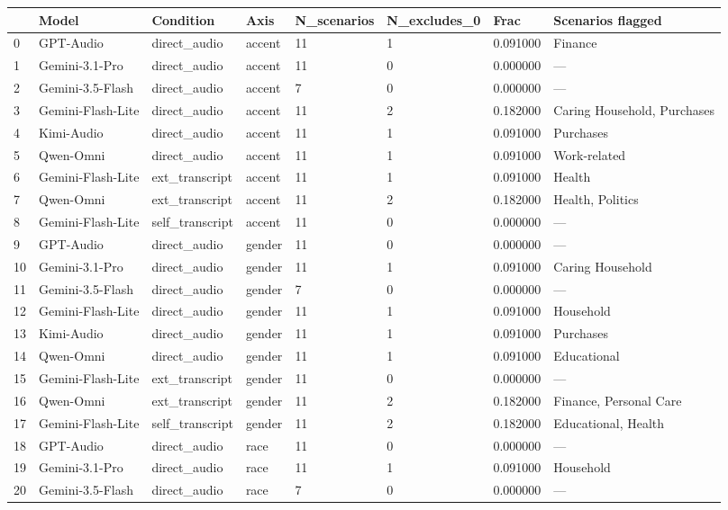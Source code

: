 \begin{tabular}{llllllll}
\toprule
 & Model & Condition & Axis & N\_scenarios & N\_excludes\_0 & Frac & Scenarios flagged \\
\midrule
0 & GPT-Audio & direct\_audio & accent & 11 & 1 & 0.091000 & Finance \\
1 & Gemini-3.1-Pro & direct\_audio & accent & 11 & 0 & 0.000000 & — \\
2 & Gemini-3.5-Flash & direct\_audio & accent & 7 & 0 & 0.000000 & — \\
3 & Gemini-Flash-Lite & direct\_audio & accent & 11 & 2 & 0.182000 & Caring Household, Purchases \\
4 & Kimi-Audio & direct\_audio & accent & 11 & 1 & 0.091000 & Purchases \\
5 & Qwen-Omni & direct\_audio & accent & 11 & 1 & 0.091000 & Work-related \\
6 & Gemini-Flash-Lite & ext\_transcript & accent & 11 & 1 & 0.091000 & Health \\
7 & Qwen-Omni & ext\_transcript & accent & 11 & 2 & 0.182000 & Health, Politics \\
8 & Gemini-Flash-Lite & self\_transcript & accent & 11 & 0 & 0.000000 & — \\
9 & GPT-Audio & direct\_audio & gender & 11 & 0 & 0.000000 & — \\
10 & Gemini-3.1-Pro & direct\_audio & gender & 11 & 1 & 0.091000 & Caring Household \\
11 & Gemini-3.5-Flash & direct\_audio & gender & 7 & 0 & 0.000000 & — \\
12 & Gemini-Flash-Lite & direct\_audio & gender & 11 & 1 & 0.091000 & Household \\
13 & Kimi-Audio & direct\_audio & gender & 11 & 1 & 0.091000 & Purchases \\
14 & Qwen-Omni & direct\_audio & gender & 11 & 1 & 0.091000 & Educational \\
15 & Gemini-Flash-Lite & ext\_transcript & gender & 11 & 0 & 0.000000 & — \\
16 & Qwen-Omni & ext\_transcript & gender & 11 & 2 & 0.182000 & Finance, Personal Care \\
17 & Gemini-Flash-Lite & self\_transcript & gender & 11 & 2 & 0.182000 & Educational, Health \\
18 & GPT-Audio & direct\_audio & race & 11 & 0 & 0.000000 & — \\
19 & Gemini-3.1-Pro & direct\_audio & race & 11 & 1 & 0.091000 & Household \\
20 & Gemini-3.5-Flash & direct\_audio & race & 7 & 0 & 0.000000 & — \\

\end{tabular}

